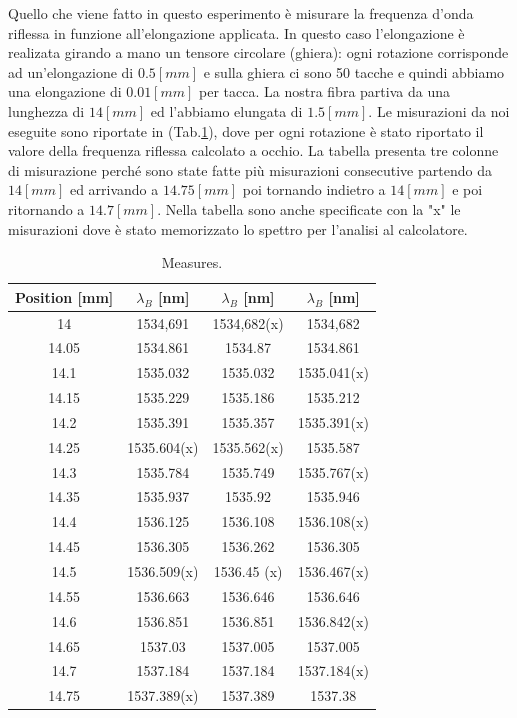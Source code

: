 Quello che viene fatto in questo esperimento è misurare la frequenza d'onda riflessa in funzione all'elongazione applicata. In questo caso l'elongazione è realizata girando a mano un tensore circolare (ghiera): ogni rotazione corrisponde ad un'elongazione di $0.5[mm]$ e sulla ghiera ci sono 50 tacche e quindi abbiamo una elongazione di $0.01[mm]$ per tacca. La nostra fibra partiva da una lunghezza di $14[mm]$ ed l'abbiamo elungata di $1.5[mm]$. Le misurazioni da noi eseguite sono riportate in (Tab.\ref{table:measures}), dove per ogni rotazione è stato riportato il valore della frequenza riflessa calcolato a occhio. La tabella presenta tre colonne di misurazione perché sono state fatte più misurazioni consecutive partendo da $14[mm]$ ed arrivando a $14.75[mm]$ poi tornando indietro a $14[mm]$ e poi ritornando a $14.7[mm]$. Nella tabella sono anche specificate con la "x" le misurazioni dove è stato memorizzato lo spettro per l'analisi al calcolatore.
\begin{table}[h]
  \begin{tabular}{c|c|c|c}
      Position [mm]  &  $\lambda_B$  [nm]  &  $\lambda_B$  [nm]  &  $\lambda_B$  [nm]  \\
      \hline
      14     &  1534,691     &  1534,682(x)  &  1534,682     \\
      14.05  &  1534.861     &  1534.87      &  1534.861     \\
      14.1   &  1535.032     &  1535.032     &  1535.041(x)  \\
      14.15  &  1535.229     &  1535.186     &  1535.212     \\
      14.2   &  1535.391     &  1535.357     &  1535.391(x)  \\
      14.25  &  1535.604(x)  &  1535.562(x)  &  1535.587     \\
      14.3   &  1535.784     &  1535.749     &  1535.767(x)  \\
      14.35  &  1535.937     &  1535.92      &  1535.946     \\
      14.4   &  1536.125     &  1536.108     &  1536.108(x)  \\
      14.45  &  1536.305     &  1536.262     &  1536.305     \\
      14.5   &  1536.509(x)  &  1536.45 (x)  &  1536.467(x)  \\
      14.55  &  1536.663     &  1536.646     &  1536.646     \\
      14.6   &  1536.851     &  1536.851     &  1536.842(x)  \\
      14.65  &  1537.03      &  1537.005     &  1537.005     \\
      14.7   &  1537.184     &  1537.184     &  1537.184(x)  \\
      14.75  &  1537.389(x)  &  1537.389     &  1537.38      \\

  \end{tabular}
  \caption{Measures.}
  \label{table:measures}
\end{table}
